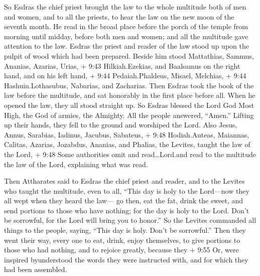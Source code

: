  So Esdras the chief priest brought the law to the whole
multitude both of men and women, and to all the priests, to hear the law
on the new moon of the seventh month.  He read in the broad
place before the porch of the temple from morning until midday, before
both men and women; and all the multitude gave attention to the law.
 Esdras the priest and reader of the law stood up upon the
pulpit of wood which had been prepared.  Beside him stood
Mattathias, Sammus, Ananias, Azarias, Urias, + 9:43 Hilkiah.Ezekias, and
Baalsamus on the right hand,  and on his left hand, + 9:44
Pedaiah.Phaldeus, Misael, Melchias, + 9:44 Hashuin.Lothasubus, Nabarias,
and Zacharias.  Then Esdras took the book of the law before
the multitude, and sat honorably in the first place before all.
 When he opened the law, they all stood straight up. So
Esdras blessed the Lord God Most High, the God of armies, the Almighty.
 All the people answered, ``Amen.'' Lifting up their hands,
they fell to the ground and worshiped the Lord.  Also
Jesus, Annus, Sarabias, Iadinus, Jacubus, Sabateus, + 9:48
Hodiah.Auteas, Maiannas, Calitas, Azarias, Jozabdus, Ananias, and
Phalias, the Levites, taught the law of the Lord, + 9:48 Some
authorities omit and read\ldots Lord.and read to the multitude the law
of the Lord, explaining what was read.

 Then Attharates said to Esdras the chief priest and
reader, and to the Levites who taught the multitude, even to all,
 ``This day is holy to the Lord---now they all wept when
they heard the law---  go then, eat the fat, drink the
sweet, and send portions to those who have nothing;  for
the day is holy to the Lord. Don't be sorrowful, for the Lord will bring
you to honor.''  So the Levites commanded all things to the
people, saying, ``This day is holy. Don't be sorrowful.'' 
Then they went their way, every one to eat, drink, enjoy themselves, to
give portions to those who had nothing, and to rejoice greatly,
 because they + 9:55 Or, were inspired byunderstood the
words they were instructed with, and for which they had been assembled.
